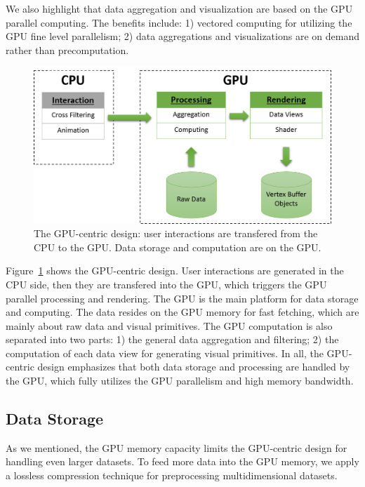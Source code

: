 We also highlight that data aggregation and visualization are  based on the GPU parallel computing. The benefits include: 1) vectored computing for utilizing the GPU fine level parallelism; 2) data aggregations  and visualizations are on demand rather than precomputation.


\begin{figure}[htb]
	\centering
	
	\includegraphics[width=1.0\linewidth]{pic/arch.png}
	\parbox[t]{1.0\columnwidth}{\relax
	}
	\caption{\label{fig:architecture} The GPU-centric design: user interactions are transfered from the CPU to the GPU. Data storage and computation are on the GPU. }
\end{figure}


Figure~\ref{fig:architecture} shows the GPU-centric design. User interactions are generated in the CPU side, then they are transfered into the GPU, which triggers the GPU parallel processing and rendering.
The GPU is the main platform for data storage and  computing. 
The data resides on the GPU memory for fast fetching, which are mainly about raw data and visual primitives.  The GPU computation is also separated into two parts: 1) the general data aggregation and filtering; 2) the computation of each data view for generating visual primitives.  
In all, the GPU-centric design emphasizes that both data storage and processing are handled by the GPU, which fully utilizes the GPU  parallelism and high memory bandwidth.

\subsection{Data Storage}
As we mentioned, the GPU memory capacity limits the GPU-centric design for handling even larger datasets.  To feed more data into the GPU memory, we apply a lossless compression technique for preprocessing  multidimensional datasets. 


